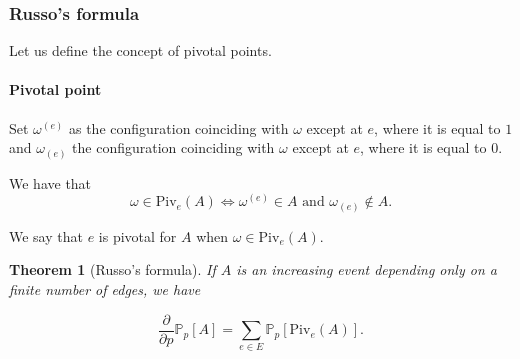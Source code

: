 \documentclass[a4paper,11pt]{article}
\theoremstyle{plain}
\newtheorem{theorem}{Theorem}[section]
\theoremstyle{definition}
\theoremstyle{remark}
\begin{document}
\subsubsection{Russo's formula}
Let us define the concept of pivotal points.
\paragraph{Pivotal point}
Set $\omega^{(e)}$ as the configuration coinciding with $\omega$ except at $e$, where it is equal to $1$ and $\omega_{(e)}$ the configuration coinciding with $\omega$ except at $e$, where it is equal to $0$.

We have that
\[ \omega \in \mathrm{Piv}_e(A) \Longleftrightarrow \omega^{(e)} \in A \text{ and } \omega_{(e)} \not\in A. \]

We say that $e$ is pivotal for $A$ when $\omega \in \mathrm{Piv}_e(A)$.

\begin{theorem}[Russo's formula]
\label{russo_formula}
If $A$ is an increasing event depending only on a finite number of edges, we have

\[ \frac{\partial }{\partial p}{\mathbb{P}_p[A]} = \sum_{e \in E}{\mathbb{P}_p[\mathrm{Piv}_e(A)]}. \]
\end{theorem}
\end{document}
